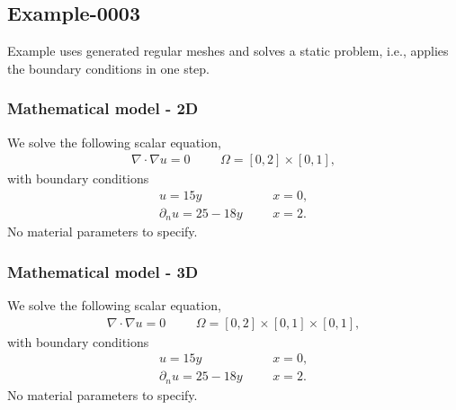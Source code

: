 %
\clearpage
%
\subsection{Example-0003}
%
Example uses generated regular meshes and solves a static problem, i.e., applies
the boundary conditions in one step.
%
%
\subsubsection{Mathematical model - 2D}
%
We solve the following scalar equation,
%
\begin{align}
    \nabla \cdot \nabla u = 0 & &&\Omega = [0, 2] \times [0, 1],
\end{align}
%
with boundary conditions
%
\begin{align}
    u = 15 y                 & &&x = 0, \\
    \partial_n u = 25 - 18 y & &&x = 2.
\end{align}
%
No material parameters to specify.
%
%
\subsubsection{Mathematical model - 3D}
%
We solve the following scalar equation,
%
\begin{align}
    \nabla \cdot \nabla u = 0 & &&\Omega = [0, 2] \times [0, 1] \times [0, 1],
\end{align}
%
with boundary conditions
%
\begin{align}
    u = 15 y                 & &&x = 0, \\
    \partial_n u = 25 - 18 y & &&x = 2.
\end{align}
%
No material parameters to specify.
%
%
